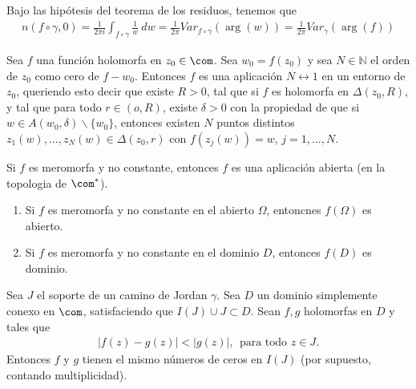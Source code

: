 \begin{obs}
Bajo las hipótesis del teorema de los residuos, tenemos que
\begin{align*}
    n(f \circ \gamma,0) = \frac{1}{2\pi i}\int_{f \circ \gamma} \frac{1}{w} \ dw = \frac{1}{2\pi} Var_{f \circ \gamma} (\arg(w)) = \frac{1}{2\pi} Var_{\gamma}(\arg(f))
\end{align*}
\end{obs}

\begin{teo}
Sea $f$ una función holomorfa en $z_0 \in \com$. Sea $w_0 = f(z_0)$ y sea $N \in \mathbb{N}$ el orden de $z_0$ como cero de $f-w_0$. Entonces $f$ es una aplicación $N \longleftrightarrow 1$ en un entorno de $z_0$, queriendo esto decir que existe $R > 0$, tal que si $f$ es holomorfa en $\Delta(z_0,R)$, y tal que para todo $r \in (o,R)$, existe $\delta > 0$ con la propiedad de que si $w \in A(w_0,\delta) \backslash \{w_0\}$, entonces existen $N$ puntos distintos $z_1(w),...,z_N(w) \in \Delta(z_0,r)$ con $f(z_j(w)) = w$, $j = 1,...,N$.
\end{teo}

\begin{cor}
Si $f$ es meromorfa y no constante, entonces $f$ es una aplicación abierta (en la topologia de $\com^*$).
\end{cor}

\begin{obs}
\begin{enumerate}
    \item Si $f$ es meromorfa y no constante en el abierto $\Omega$, entoncnes $f(\Omega)$ es abierto.
    \item Si $f$ es meromorfa y no constante en el dominio $D$, entonces  $f(D)$ es dominio.
\end{enumerate}
\end{obs}

\begin{teo}
Sea $J$ el soporte de un camino de Jordan $\gamma$. Sea $D$ un dominio simplemente conexo en $\com$, satisfaciendo que $I(J) \cup J \subset D$. Sean $f,g$ holomorfas en $D$ y tales que
\begin{align*}
    |f(z) - g(z)| < |g(z)|, \ \ \text{para todo } z \in J.
\end{align*}
Entonces $f$ y $g$ tienen el mismo números de ceros en $I(J)$ (por supuesto, contando multiplicidad).
\end{teo}

